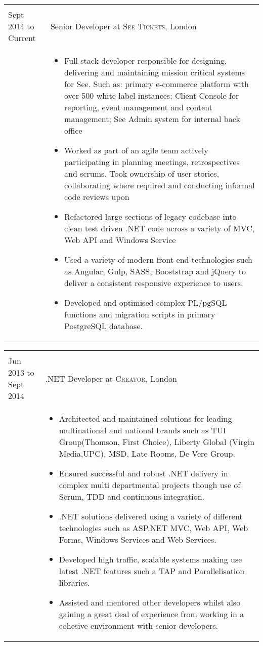 \documentclass[a4paper,10pt]{article} %
\begin{document}
\begin{tabular}{ L{2cm} | L{11cm}}
	 \\
	Sept 2014 to Current & Senior Developer at \textsc{See Tickets}, London \\ 
	&\MPtrue
	\begin{itemize}[leftmargin=*] 
			\item Full stack developer responsible for designing, delivering and maintaining mission critical systems for See. Such as: primary e-commerce platform with over 500 white label instances; Client Console for reporting, event management and content management; See Admin system for internal back office 
			\item Worked as part of an agile team actively participating in planning meetings, retrospectives and scrums. Took ownership of user stories, collaborating where required and conducting informal code reviews upon 
			\item Refactored large sections of legacy codebase into clean test driven .NET code across a variety of MVC, Web API and Windows Service 
			\item Used a variety of modern front end technologies such as Angular, Gulp, SASS, Booststrap and jQuery to deliver a consistent responsive experience to users. 	
			\item Developed and optimised complex PL/pgSQL functions and migration scripts in primary PostgreSQL database. 	
	\end{itemize} \\	
\end{tabular}

\begin{tabular}{ L{2cm} | L{11cm}}
	 \\
	Jun 2013 to Sept 2014 & .NET Developer at \textsc{Creator}, London \\
&\MPtrue	   
	\begin{itemize}[leftmargin=*]  
		\item Architected and maintained solutions for leading multinational and national brands such as TUI Group(Thomson, First Choice), Liberty Global (Virgin Media,UPC), MSD, Late Rooms, De Vere Group.
		\item Ensured successful and robust .NET delivery in complex multi departmental projects though use of Scrum, TDD and continuous integration. 
		\item .NET solutions delivered using a variety of different technologies such as ASP.NET MVC, Web API, Web Forms, Windows Services and Web Services. 		
		\item Developed high traffic, scalable systems making use latest .NET features such a TAP and Parallelisation libraries. 		
		\item Assisted and mentored other developers whilst also gaining a great deal of experience from working in a cohesive environment with senior developers. 
	\end{itemize} \\	
\end{tabular}
\end{document}
